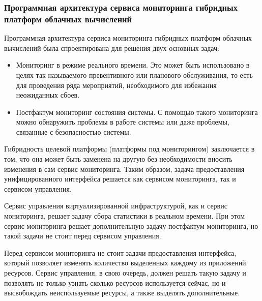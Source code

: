 \subsubsection{Программная архитектура сервиса мониторинга гибридных платформ облачных вычислений}
Программная архитектура сервиса мониторинга гибридных платформ облачных вычислений \cite{hybrid-cloud-computing-monitoring-software-architecture} была спроектирована для решения двух основных задач:
\begin{itemize} 
    \item Мониторинг в режиме реального времени. Это может быть использовано в целях так называемого превентивного или планового обслуживания, то есть для проведения ряда мероприятий, необходимого для избежания неожиданных сбоев.
    \item Постфактум мониторинг состояния системы. С помощью такого мониторинга можно обнаружить проблемы в работе системы или даже проблемы, связанные с безопасностью системы.
\end{itemize} 
Гибридность целевой платформы (платформы под мониторингом) заключается в том, что она может быть заменена на другую без необходимости вносить изменения в сам сервис мониторинга. 
Таким образом, задача предоставления унифицированного интерфейса решается как сервисом мониторинга, так и сервисом управления.

Сервис управления виртуализированной инфраструктурой, как и сервис мониторинга, решает задачу сбора статистики в реальном времени. 
При этом сервис мониторинга решает дополнительную задачу постфактум мониторинга, но такой задачи не стоит перед сервисом управления.

Перед сервисом мониторинга не стоит задачи предоставления интерфейса, который позволяет изменять количество выделенных каждому из приложений ресурсов. 
Сервис управления, в свою очередь, должен решать такую задачу и позволять не только узнать сколько ресурсов используется сейчас, но и высвобождать неиспользуемые ресурсы, а также выделять дополнительные.